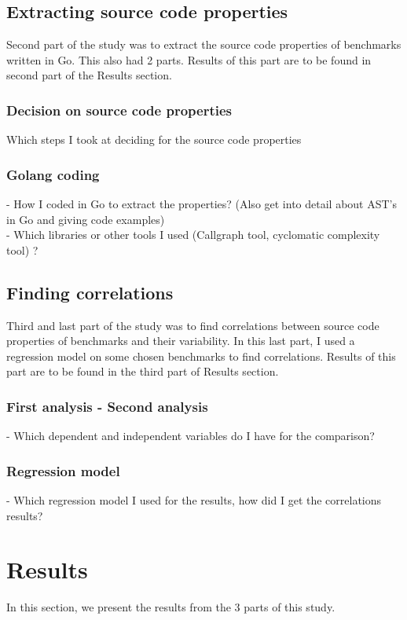 \documentclass{seal_thesis}
\begin{document}
\section{Extracting source code properties}
Second part of the study was to extract the source code properties of benchmarks written in Go. This also had 2 parts. Results of this part are to be found in second part of the Results section.

\subsection{Decision on source code properties}
Which steps I took at deciding for the source code properties

\subsection{Golang coding}
- How I coded in Go to extract the properties? (Also get into detail about AST's in Go and giving code examples) \\
- Which libraries or other tools I used (Callgraph tool, cyclomatic complexity tool) ? \\

\section{Finding correlations}
Third and last part of the study was to find correlations between source code properties of benchmarks and their variability. In this last part, I used a regression model on some chosen benchmarks to find correlations. Results of this part are to be found in the third part of Results section.
\subsection{First analysis - Second analysis}
- Which dependent and independent variables do I have for the comparison?
\subsection{Regression model}
- Which regression model I used for the results, how did I get the correlations results?

\chapter{Results}
In this section, we present the results from the 3 parts of this study. 
\end{document}
